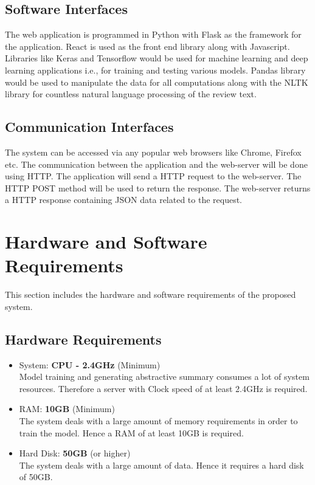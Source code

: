 \documentclass[11pt]{report}
\begin{document}
\subsection{Software Interfaces}
The web application is programmed in Python with Flask as the framework for the application. React is used as the front end library along with Javascript. Libraries like Keras and Tensorflow would be used for machine learning and deep learning applications i.e., for training and testing various models. Pandas library would be used to manipulate the data for all computations along with the NLTK library for countless natural language processing of the review text.

\subsection{Communication Interfaces}
The system can be accessed via any popular web browsers like Chrome, Firefox etc. The communication between the application and the web-server will be done using HTTP. The application will send a HTTP request to the web-server. The HTTP POST method will be used to return the response. The web-server returns a HTTP response containing JSON data related to the request.

\section{Hardware and Software Requirements}
This section includes the hardware and software requirements of the proposed system.

\subsection{Hardware Requirements}

\begin{itemize}
\item System: \textbf{CPU - 2.4GHz} (Minimum)
\\Model training and generating abstractive summary consumes a lot of system resources. Therefore a server with Clock speed of at least 2.4GHz is required. \\

\item RAM: \textbf{10GB} (Minimum) \\
The system deals with a large amount of memory requirements in order to train the model. Hence a RAM of at least 10GB is required. \\

\item Hard Disk: \textbf{50GB} (or higher) \\
The system deals with a large amount of data. Hence it requires a hard disk of 50GB.
\end{itemize} 
\end{document}
